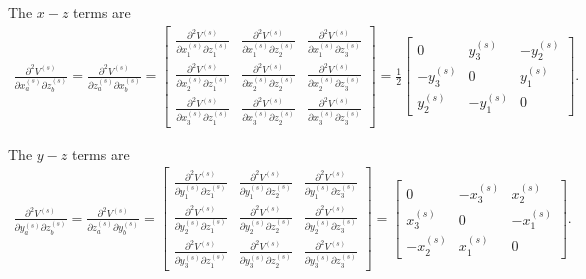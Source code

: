 \documentclass[12pt,aps,pre]{revtex4}
\begin{document}
The $x-z$ terms are
%
\begin{eqnarray}
\frac{\partial^2V^{(s)}}{\partial x_a^{(s)} \partial z_b^{(s)}} = \frac{\partial^2V^{(s)}}{\partial z_a^{(s)} \partial x_b^{(s)}} = 
\begin{bmatrix}
\frac{\partial^2V^{(s)}}{\partial x_1^{(s)} \partial z_1^{(s)}} & \frac{\partial^2V^{(s)}}{\partial x_1^{(s)} \partial z_2^{(s)}}  & \frac{\partial^2V^{(s)}}{\partial x_1^{(s)} \partial z_3^{(s)}} \\
%
\frac{\partial^2V^{(s)}}{\partial x_2^{(s)} \partial z_1^{(s)}} & \frac{\partial^2V^{(s)}}{\partial x_2^{(s)} \partial z_2^{(s)}}  & \frac{\partial^2V^{(s)}}{\partial x_2^{(s)} \partial z_3^{(s)}} \\
%
\frac{\partial^2V^{(s)}}{\partial x_3^{(s)} \partial z_1^{(s)}} & \frac{\partial^2V^{(s)}}{\partial x_3^{(s)} \partial z_2^{(s)}}  & \frac{\partial^2V^{(s)}}{\partial x_3^{(s)} \partial z_3^{(s)}}
\end{bmatrix} =
\frac{1}{2}
\begin{bmatrix}
0 & y_3^{(s)} & -y_2^{(s)} \\
-y_3^{(s)} & 0 & y_1^{(s)} \\
y_2^{(s)} & -y_1^{(s)} & 0
\end{bmatrix}.
\end{eqnarray}
%

The $y-z$ terms are
%
\begin{eqnarray}
\frac{\partial^2V^{(s)}}{\partial y_a^{(s)} \partial z_b^{(s)}} = \frac{\partial^2V^{(s)}}{\partial z_a^{(s)} \partial y_b^{(s)}} = 
\begin{bmatrix}
\frac{\partial^2V^{(s)}}{\partial y_1^{(s)} \partial z_1^{(s)}} & \frac{\partial^2V^{(s)}}{\partial y_1^{(s)} \partial z_2^{(s)}}  & \frac{\partial^2V^{(s)}}{\partial y_1^{(s)} \partial z_3^{(s)}} \\
%
\frac{\partial^2V^{(s)}}{\partial y_2^{(s)} \partial z_1^{(s)}} & \frac{\partial^2V^{(s)}}{\partial y_2^{(s)} \partial z_2^{(s)}}  & \frac{\partial^2V^{(s)}}{\partial y_2^{(s)} \partial z_3^{(s)}} \\
%
\frac{\partial^2V^{(s)}}{\partial y_3^{(s)} \partial z_1^{(s)}} & \frac{\partial^2V^{(s)}}{\partial y_3^{(s)} \partial z_2^{(s)}}  & \frac{\partial^2V^{(s)}}{\partial y_3^{(s)} \partial z_3^{(s)}}
\end{bmatrix} =
\begin{bmatrix}
0 & -x_3^{(s)} & x_2^{(s)} \\
x_3^{(s)} & 0 & -x_1^{(s)} \\
-x_2^{(s)} & x_1^{(s)} & 0
\end{bmatrix}.
\end{eqnarray}
%




\end{document}

